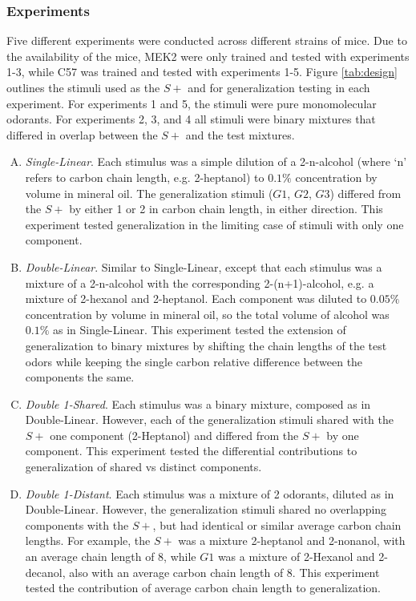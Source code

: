 \subsubsection*{Experiments}
\label{sec:methods_experiment_types}
Five different experiments were conducted across different strains of mice. 
Due to the availability of the mice, MEK2 were only trained and tested with experiments 1-3, while C57 was trained and tested with experiments 1-5.  
Figure \ref{tab:design} outlines the stimuli used as the $S+$ and for generalization testing in each experiment. 
For experiments 1 and 5, the stimuli were pure monomolecular odorants. 
For experiments 2, 3, and 4 all stimuli were binary mixtures that differed in overlap between the $S+$ and the test mixtures. 

\begin{enumerate}[(A)]
\item \textit{Single-Linear}. Each stimulus was a simple dilution of a 2-n-alcohol (where `n' refers to carbon chain length, e.g. 2-heptanol) to $0.1\%$ concentration by volume in mineral oil.
The generalization stimuli ($G1$, $G2$, $G3$) differed from the $S+$ by either 1 or 2 in carbon chain length, in either direction.  
This experiment tested generalization in the limiting case of stimuli with only one component.   

\item \textit{Double-Linear}. Similar to Single-Linear, except that each stimulus was a mixture of a 2-n-alcohol with the corresponding 2-(n+1)-alcohol, e.g. a mixture of 2-hexanol and 2-heptanol.  
Each component was diluted to $0.05\%$ concentration by volume in mineral oil, so the total volume of alcohol was $0.1\%$ as in Single-Linear.  
This experiment tested the extension of generalization to binary mixtures by shifting the chain lengths of the test odors while keeping the single carbon relative difference between the components the same.  

\item \textit{Double 1-Shared}. Each stimulus was a binary mixture, composed as in Double-Linear. 
However, each of the generalization stimuli shared with the $S+$ one component (2-Heptanol) and differed from the $S+$ by one component.  
This experiment tested the differential contributions to generalization of shared vs distinct components.  

\item \textit{Double 1-Distant}. Each stimulus was a mixture of 2 odorants, diluted as in Double-Linear. However, the generalization stimuli shared no overlapping components with the $S+$, but had identical or similar average carbon chain lengths. 
For example, the $S+$ was a mixture 2-heptanol and 2-nonanol, with an average chain length of 8, while $G1$ was a mixture of 2-Hexanol and 2-decanol, also with an average carbon chain length of 8.  This experiment tested the contribution of average carbon chain length to generalization.  


\end{enumerate}
